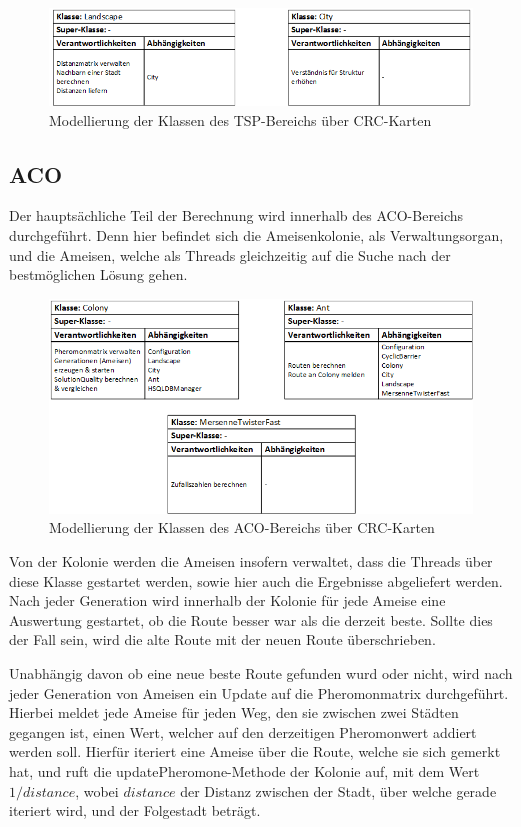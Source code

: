 \begin{figure}[h]
	\centering
	\includegraphics[width=\linewidth]{images/CRC_tsp.png}
	\caption{Modellierung der Klassen des \ac{TSP}-Bereichs über CRC-Karten}
	\label{crcTsp}
\end{figure}

\subsection{ACO}
Der hauptsächliche Teil der Berechnung wird innerhalb des \ac{ACO}-Bereichs durchgeführt. Denn hier befindet sich die Ameisenkolonie, als Verwaltungsorgan, und die Ameisen, welche als Threads gleichzeitig auf die Suche nach der bestmöglichen Lösung gehen.

\begin{figure}[h]
	\centering
	\includegraphics[width=\linewidth]{images/CRC_aco.png}
	\caption{Modellierung der Klassen des \ac{ACO}-Bereichs über CRC-Karten}
	\label{crcAco}
\end{figure}


Von der Kolonie werden die Ameisen insofern verwaltet, dass die Threads über diese Klasse gestartet werden, sowie hier auch die Ergebnisse abgeliefert werden. Nach jeder Generation wird innerhalb der Kolonie für jede Ameise eine Auswertung gestartet, ob die Route besser war als die derzeit beste. Sollte dies der Fall sein, wird die alte Route mit der neuen Route überschrieben.

Unabhängig davon ob eine neue beste Route gefunden wurd oder nicht, wird nach jeder Generation von Ameisen ein Update auf die Pheromonmatrix durchgeführt. Hierbei meldet jede Ameise für jeden Weg, den sie zwischen zwei Städten gegangen ist, einen Wert, welcher auf den derzeitigen Pheromonwert addiert werden soll. Hierfür iteriert eine Ameise über die Route, welche sie sich gemerkt hat, und ruft die updatePheromone-Methode der Kolonie auf, mit dem Wert $1/distance$, wobei $distance$ der Distanz zwischen der Stadt, über welche gerade iteriert wird, und der Folgestadt beträgt. 

